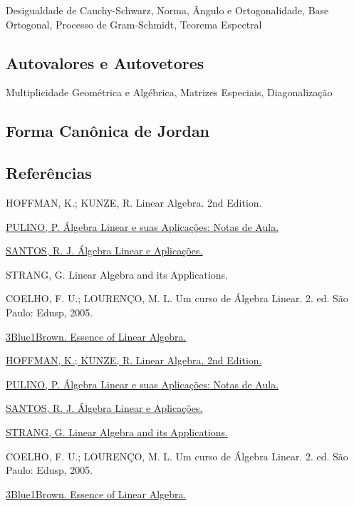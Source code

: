 \documentclass[
]{article}
\begin{document}
Desigualdade de Cauchy-Schwarz, Norma, Ângulo e Ortogonalidade, Base
Ortogonal, Processo de Gram-Schmidt, Teorema Espectral

\hypertarget{autovalores-e-autovetores}{%
\subsection{Autovalores e Autovetores}\label{autovalores-e-autovetores}}

Multiplicidade Geométrica e Algébrica, Matrizes Especiais,
Diagonalização

\hypertarget{forma-canuxf4nica-de-jordan}{%
\subsection{Forma Canônica de
Jordan}\label{forma-canuxf4nica-de-jordan}}

\hypertarget{referuxeancias}{%
\subsection{Referências}\label{referuxeancias}}

HOFFMAN, K.; KUNZE, R. Linear Algebra. 2nd Edition.

\href{http://www.ime.unicamp.br/~pulino/ALESA/}{PULINO, P. Álgebra
Linear e suas Aplicações: Notas de Aula.}

\href{http://www.mat.ufmg.br/~regi/}{SANTOS, R. J. Álgebra Linear e
Aplicações.}

STRANG, G. Linear Algebra and its Applications.

COELHO, F. U.; LOURENÇO, M. L. Um curso de Álgebra Linear. 2. ed. São
Paulo: Edusp, 2005.

\href{https://www.youtube.com/playlist?list=PLZHQObOWTQDPD3MizzM2xVFitgF8hE_ab}{3Blue1Brown.
Essence of Linear Algebra.}

\href{/Volumes/Disco\%20Local/Google\%20Drive/Biblioteca\%20Computação,\%20Lógica\%20e\%20Matemática/Álgebra\%20Linear/Kenneth\%20M\%20Hoffman,\%20Ray\%20Kunze\%20-\%20Linear\%20Algebra\%20(2nd\%20Edition).pdf}{HOFFMAN,
K.; KUNZE, R. Linear Algebra. 2nd Edition.}

\href{/Volumes/Disco\%20Local/Google\%20Drive/Biblioteca\%20Computação,\%20Lógica\%20e\%20Matemática/Álgebra\%20Linear/ÁlgebraLinear\%20-\%20Pulino.pdf}{PULINO,
P. Álgebra Linear e suas Aplicações: Notas de Aula.}

\href{http://www.mat.ufmg.br/~regi/}{SANTOS, R. J. Álgebra Linear e
Aplicações.}

\href{/Volumes/Disco\%20Local/Google\%20Drive/Biblioteca\%20Computação,\%20Lógica\%20e\%20Matemática/Álgebra\%20Linear/Linear\%20Algebra\%20and\%20Its\%20Applications\%20(4ed)\%20by\%20Gilbert\%20Strang\%20(z-lib.org).pdf}{STRANG,
G. Linear Algebra and its Applications.}

COELHO, F. U.; LOURENÇO, M. L. Um curso de Álgebra Linear. 2. ed. São
Paulo: Edusp, 2005.

\href{https://www.youtube.com/playlist?list=PLZHQObOWTQDPD3MizzM2xVFitgF8hE_ab}{3Blue1Brown.
Essence of Linear Algebra.}
\end{document}
